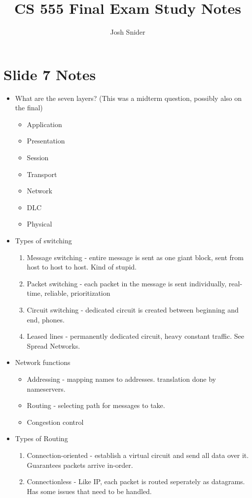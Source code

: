\documentclass{scrartcl}
\begin{document}
\title{CS 555 Final Exam Study Notes}
\author{Josh Snider}
\maketitle
\section*{Slide 7 Notes}
\begin{itemize}
\item What are the seven layers? (This was a midterm question, possibly also on the final)
\begin{itemize}
\item Application
\item Presentation
\item Session
\item Transport
\item Network
\item DLC
\item Physical
\end{itemize}
\item Types of switching
\begin{enumerate}
\item Message switching - entire message is sent as one giant block, sent from host to host to host. Kind of stupid.
\item Packet switching - each packet in the message is sent individually, real-time, reliable, prioritization
\item Circuit switching - dedicated circuit is created between beginning and end, phones.
\item Leased lines - permanently dedicated circuit, heavy constant traffic. See Spread Networks.
\end{enumerate}
\item Network functions
\begin{itemize}
\item Addressing - mapping names to addresses. translation done by nameservers.
\item Routing - selecting path for messages to take.
\item Congestion control
\end{itemize}
\item Types of Routing
\begin{enumerate}
\item Connection-oriented - establish a virtual circuit and send all data over it. Guarantees packets arrive in-order.
\item Connectionless - Like IP, each packet is routed seperately as datagrams. Has some issues that need to be handled.

\end{enumerate}
\end{itemize}
\end{document}
